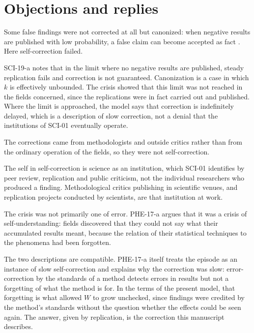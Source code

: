 \documentclass{situationist-preprint}
\begin{document}
\section{Objections and replies}

\begin{objection}
Some false findings were not corrected at all but canonized: when negative results are published with low probability, a false claim can become accepted as fact \citep{Nissen2016}. Here self-correction failed.
\end{objection}

\begin{reply}
SCI-19-a notes that in the limit where no negative results are published, steady replication fails and correction is not guaranteed. Canonization is a case in which $k$ is effectively unbounded. The crisis showed that this limit was not reached in the fields concerned, since the replications were in fact carried out and published. Where the limit is approached, the model says that correction is indefinitely delayed, which is a description of slow correction, not a denial that the institutions of SCI-01 eventually operate.
\end{reply}

\begin{objection}
The corrections came from methodologists and outside critics rather than from the ordinary operation of the fields, so they were not self-correction.
\end{objection}

\begin{reply}
The self in self-correction is science as an institution, which SCI-01 identifies by peer review, replication and public criticism, not the individual researchers who produced a finding. Methodological critics publishing in scientific venues, and replication projects conducted by scientists, are that institution at work.
\end{reply}

\begin{objection}
The crisis was not primarily one of error. PHE-17-a argues that it was a crisis of self-understanding: fields discovered that they could not say what their accumulated results meant, because the relation of their statistical techniques to the phenomena had been forgotten.
\end{objection}

\begin{reply}
The two descriptions are compatible. PHE-17-a itself treats the episode as an instance of slow self-correction and explains why the correction was slow: error-correction by the standards of a method detects errors in results but not a forgetting of what the method is for. In the terms of the present model, that forgetting is what allowed $W$ to grow unchecked, since findings were credited by the method's standards without the question whether the effects could be seen again. The answer, given by replication, is the correction this manuscript describes.
\end{reply}
\end{document}
